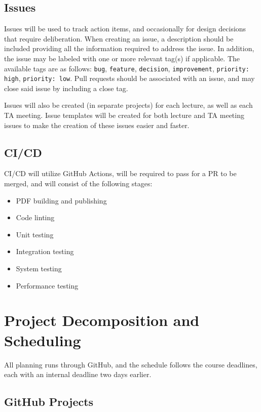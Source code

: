 \documentclass{article}
\begin{document}
\subsection{Issues}

Issues will be used to track action items, and occasionally for design decisions that require
deliberation. When creating an issue, a description should be included providing all the information
required to address the issue. In addition, the issue may be labeled with one or more relevant
tag(s) if applicable. The available tags are as follows: \verb|bug|, \verb|feature|, \verb|decision|,
\verb|improvement|, \verb|priority: high|, \verb|priority: low|. Pull requests should be associated
with an issue, and may close said issue by including a close tag.

\vspace{5mm}

Issues will also be created (in separate projects) for each lecture, as well as each TA meeting.
Issue templates will be created for both lecture and TA meeting issues to make the creation
of these issues easier and faster.

\subsection{CI/CD}

CI/CD will utilize GitHub Actions, will be required to pass for a PR to be merged, and will
consist of the following stages:
\begin{itemize}
	\item PDF building and publishing
	\item Code linting
	\item Unit testing
	\item Integration testing
	\item System testing
	\item Performance testing
\end{itemize}

\section{Project Decomposition and Scheduling}
\label{SecDecomp}

All planning runs through GitHub, and the schedule follows the course
deadlines, each with an internal deadline two days earlier.

\subsection{GitHub Projects}
\end{document}
